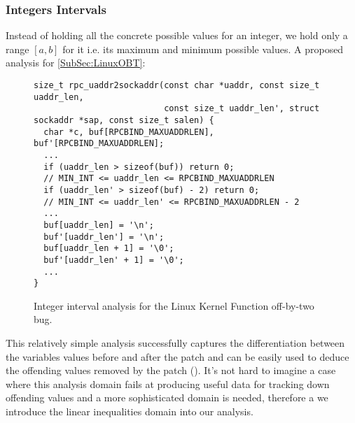 \subsubsection{Integers Intervals}
Instead of holding all the concrete possible values for an integer, we hold only a range $[a,b]$ for it i.e. its maximum and minimum possible values.
A proposed analysis for \ref{SubSec:LinuxOBT}:
\begin{figure}[H]
\begin{lstlisting}
size_t rpc_uaddr2sockaddr(const char *uaddr, const size_t uaddr_len,
                          const size_t uaddr_len', struct sockaddr *sap, const size_t salen) {
  char *c, buf[RPCBIND_MAXUADDRLEN], buf'[RPCBIND_MAXUADDRLEN];
  ...
  if (uaddr_len > sizeof(buf)) return 0;
  // MIN_INT <= uaddr_len <= RPCBIND_MAXUADDRLEN
  if (uaddr_len' > sizeof(buf) - 2) return 0;
  // MIN_INT <= uaddr_len' <= RPCBIND_MAXUADDRLEN - 2
  ...
  buf[uaddr_len] = '\n';
  buf'[uaddr_len'] = '\n';
  buf[uaddr_len + 1] = '\0';
  buf'[uaddr_len' + 1] = '\0';
  ...
}
\end{lstlisting}\caption{Integer interval analysis for the Linux Kernel Function  off-by-two bug.}
\end{figure}
This relatively simple analysis successfully captures the differentiation between the variables values before and after the patch and can be easily used to deduce the offending values removed by the patch ().
It's not hard to imagine a case where this analysis domain fails at producing useful data for tracking down offending values and a more sophisticated domain is needed, therefore a we introduce the linear inequalities domain into our analysis.

